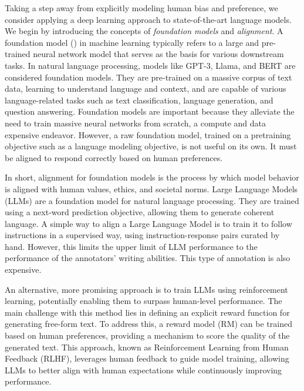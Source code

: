 \documentclass[
  letterpaper,
  numbers=noenddot,
  DIV=11,
  oneside]{scrreprt}
\theoremstyle{remark}
\begin{document}
Taking a step away from explicitly modeling human bias and preference,
we consider applying a deep learning approach to state-of-the-art
language models. We begin by introducing the concepts of
\emph{foundation models} and \emph{alignment}. A foundation model
() in machine learning
typically refers to a large and pre-trained neural network model that
serves as the basis for various downstream tasks. In natural language
processing, models like GPT-3, Llama, and BERT are considered foundation
models. They are pre-trained on a massive corpus of text data, learning
to understand language and context, and are capable of various
language-related tasks such as text classification, language generation,
and question answering. Foundation models are important because they
alleviate the need to train massive neural networks from scratch, a
compute and data expensive endeavor. However, a raw foundation model,
trained on a pretraining objective such as a language modeling
objective, is not useful on its own. It must be aligned to respond
correctly based on human preferences.

In short, alignment for foundation models is the process by which model
behavior is aligned with human values, ethics, and societal norms. Large
Language Models (LLMs) are a foundation model for natural language
processing. They are trained using a next-word prediction objective,
allowing them to generate coherent language. A simple way to align a
Large Language Model is to train it to follow instructions in a
supervised way, using instruction-response pairs curated by hand.
However, this limits the upper limit of LLM performance to the
performance of the annotators' writing abilities. This type of
annotation is also expensive.

An alternative, more promising approach is to train LLMs using
reinforcement learning, potentially enabling them to surpass human-level
performance. The main challenge with this method lies in defining an
explicit reward function for generating free-form text. To address this,
a reward model (RM) can be trained based on human preferences, providing
a mechanism to score the quality of the generated text. This approach,
known as Reinforcement Learning from Human Feedback (RLHF), leverages
human feedback to guide model training, allowing LLMs to better align
with human expectations while continuously improving performance.
\end{document}
